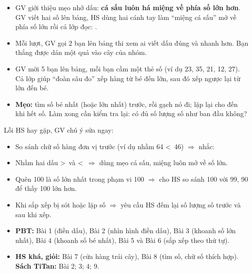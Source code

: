 \documentclass[../main.tex]{subfiles}
\begin{document}
\begin{itemize}
    \item GV giới thiệu mẹo nhớ dấu: \textbf{cá sấu luôn há miệng về phía số lớn hơn}. GV viết hai số lên bảng, HS dùng hai cánh tay làm “miệng cá sấu” mở về phía số lớn rồi cả lớp đọc: .
    \item Mỗi lượt, GV gọi 2 bạn lên bảng thi xem ai viết dấu đúng và nhanh hơn. Bạn thắng được dán một quả vào cây của nhóm.
\end{itemize}
\begin{center}
    \GAmeo
\end{center}
\begin{itemize}
    \item GV mời 5 bạn lên bảng, mỗi bạn cầm một thẻ số (ví dụ 23, 35, 21, 12, 27). Cả lớp giúp “đoàn sâu đo” xếp hàng từ bé đến lớn, sau đó xếp ngược lại từ lớn đến bé.
    \item \textbf{Mẹo:} tìm số bé nhất (hoặc lớn nhất) trước, rồi gạch nó đi; lặp lại cho đến khi hết số. Làm xong cần kiểm tra lại: có đủ số lượng số như ban đầu không?
\end{itemize}
\begin{luuy}
    Lỗi HS hay gặp, GV chú ý sửa ngay:
    \begin{itemize}
        \item So sánh chữ số hàng đơn vị trước (ví dụ nhầm 64 \textless\ 46) $\Rightarrow$ nhắc: 
        \item Nhầm hai dấu \textgreater\ và \textless\ $\Rightarrow$ dùng mẹo cá sấu, miệng luôn mở về số lớn.
        \item Quên 100 là số lớn nhất trong phạm vi 100 $\Rightarrow$ cho HS so sánh 100 với 99, 90 để thấy 100 lớn hơn.
        \item Khi sắp xếp bị sót hoặc lặp số $\Rightarrow$ yêu cầu HS đếm lại số lượng số trước và sau khi xếp.
    \end{itemize}
\end{luuy}
\begin{itemize}
    \item \textbf{PBT:} Bài 1 (điền dấu), Bài 2 (nhìn hình điền dấu), Bài 3 (khoanh số lớn nhất), Bài 4 (khoanh số bé nhất), Bài 5 và Bài 6 (sắp xếp theo thứ tự).
    \item \textbf{HS khá, giỏi:} Bài 7 (cửa hàng trái cây), Bài 8 (tìm số, chữ số thích hợp). \textbf{Sách TiTan:} Bài 2; 3; 4; 9.
\end{itemize}
\end{document}
